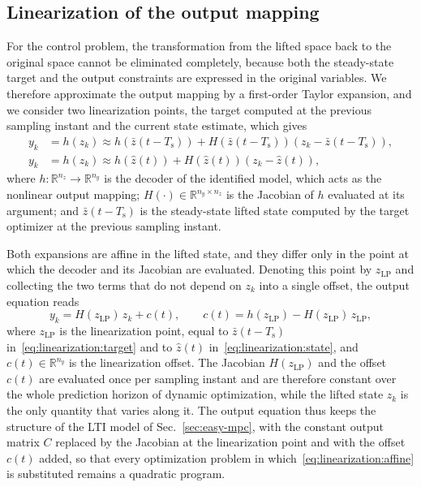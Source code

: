 \documentclass[preprint,12pt,authoryear]{elsarticle}
\theoremstyle{remark}
\newcommand{\ui}[2]{#1_{\text{#2}}}
\begin{document}
\subsection{Linearization of the output mapping}
For the control problem, the transformation from the lifted space back to the original space cannot be eliminated completely, because both the steady-state target and the output constraints are expressed in the original variables. We therefore approximate the output mapping by a first-order Taylor expansion, and we consider two linearization points, the target computed at the previous sampling instant and the current state estimate, which gives
\begin{subequations}
  \label{eq:linearization}
  \begin{align}
    y_k &= h(z_k) \approx h\!\left(\bar{z}(t-T_\text{s})\right) + H\!\left(\bar{z}(t-T_\text{s})\right)\!\left(z_k - \bar{z}(t-T_\text{s})\right), \label{eq:linearization:target} \\
    y_k &= h(z_k) \approx h\!\left(\hat{z}(t)\right) + H\!\left(\hat{z}(t)\right)\!\left(z_k - \hat{z}(t)\right), \label{eq:linearization:state}
  \end{align}
\end{subequations}
where $h : \mathbb{R}^{n_z} \to \mathbb{R}^{n_y}$ is the decoder of the identified model, which acts as the nonlinear output mapping; $H(\cdot) \in \mathbb{R}^{n_y \times n_z}$ is the Jacobian of $h$ evaluated at its argument; and $\bar{z}(t-T_\text{s})$ is the steady-state lifted state computed by the target optimizer at the previous sampling instant.

Both expansions are affine in the lifted state, and they differ only in the point at which the decoder and its Jacobian are evaluated. Denoting this point by $\ui{z}{LP}$ and collecting the two terms that do not depend on $z_k$ into a single offset, the output equation reads
\begin{equation}
  \label{eq:linearization:affine}
  y_k = H(\ui{z}{LP})\,z_k + c(t),
  \qquad
  c(t) = h(\ui{z}{LP}) - H(\ui{z}{LP})\,\ui{z}{LP},
\end{equation}
where $\ui{z}{LP}$ is the linearization point, equal to $\bar{z}(t-T_\text{s})$ in~\eqref{eq:linearization:target} and to $\hat{z}(t)$ in~\eqref{eq:linearization:state}, and $c(t) \in \mathbb{R}^{n_y}$ is the linearization offset. The Jacobian $H(\ui{z}{LP})$ and the offset $c(t)$ are evaluated once per sampling instant and are therefore constant over the whole prediction horizon of dynamic optimization, while the lifted state $z_k$ is the only quantity that varies along it. The output equation thus keeps the structure of the LTI model of Sec.~\ref{sec:easy-mpc}, with the constant output matrix $C$ replaced by the Jacobian at the linearization point and with the offset $c(t)$ added, so that every optimization problem in which~\eqref{eq:linearization:affine} is substituted remains a quadratic program.
\end{document}
